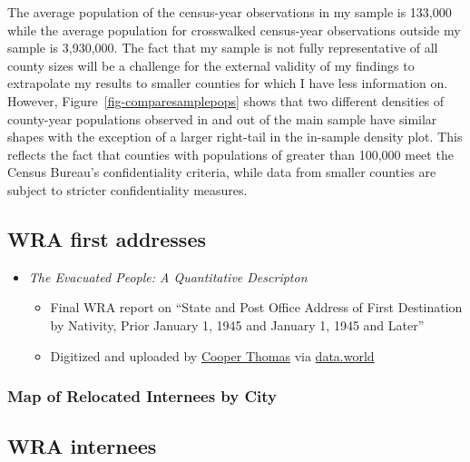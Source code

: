 \documentclass[12pt]{article}
\begin{document}
The average population of the census-year observations in my sample is
133,000 while the average population for
crosswalked census-year observations outside my sample is
3,930,000. The fact that my sample is not
fully representative of all county sizes will be a challenge for the
external validity of my findings to extrapolate my results to smaller
counties for which I have less information on. However,
Figure~\ref{fig-comparesamplepops} shows that two different densities of
county-year populations observed in and out of the main sample have
similar shapes with the exception of a larger right-tail in the
in-sample density plot. This reflects the fact that counties with
populations of greater than 100,000 meet the Census Bureau's
confidentiality criteria, while data from smaller counties are subject
to stricter confidentiality measures.

\subsection{WRA first addresses}\label{wra-first-addresses}

\begin{itemize}

\item
  {\emph{The Evacuated People: A Quantitative Descripton}}
  \cite{krug_evacuated_1946}

  \begin{itemize}
  
  \item
    Final WRA report on ``State and Post Office Address of First
    Destination by Nativity, Prior January 1, 1945 and January 1, 1945
    and Later''
  \item
    Digitized and uploaded by \href{https://cooper-thomas.com/}{Cooper Thomas} via
    \href{https://data.world/infinitecoop/japanese-internment-camps}{data.world}
  \end{itemize}
\end{itemize}

\subsubsection{Map of Relocated Internees by City}
\label{map-of-relocated-internees-by-city}

\subsection{WRA internees}\label{wra-internees}
\end{document}
